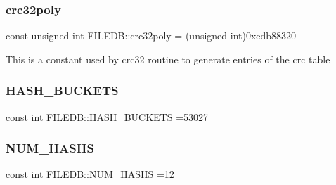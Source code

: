 \subsubsection{\texorpdfstring{crc32poly}{crc32poly}}
{\footnotesize\ttfamily const unsigned int F\+I\+L\+E\+D\+B\+::crc32poly = (unsigned int)0xedb88320}

This is a constant used by crc32 routine to generate entries of the crc table \mbox{\label{namespaceFILEDB_a791b55170820bb840d3e7d583f363415}} 
\subsubsection{\texorpdfstring{HASH\_BUCKETS}{HASH\_BUCKETS}}
{\footnotesize\ttfamily const int F\+I\+L\+E\+D\+B\+::\+H\+A\+S\+H\+\_\+\+B\+U\+C\+K\+E\+TS =53027}

\mbox{\label{namespaceFILEDB_ae46b35f4ae3d23ec8b3470306fef8ab5}} 
\subsubsection{\texorpdfstring{NUM\_HASHS}{NUM\_HASHS}}
{\footnotesize\ttfamily const int F\+I\+L\+E\+D\+B\+::\+N\+U\+M\+\_\+\+H\+A\+S\+HS =12}


